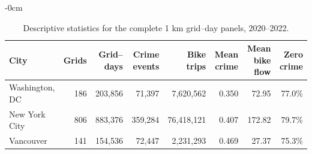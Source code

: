 
\begin{table}[H]
\caption{Descriptive statistics for the complete 1 km grid--day panels, 2020--2022.}
\label{tab:descriptive_statistics}
\begin{adjustwidth}{-\extralength}{0cm}
\raggedleft
\begin{tabular*}{\linewidth}{@{\extracolsep{\fill}}lrrrrrrr@{}}
\toprule
\textbf{City} & \textbf{Grids} & \textbf{Grid--days} &
\textbf{Crime events} & \textbf{Bike trips} &
\textbf{Mean crime} & \textbf{Mean bike flow} & \textbf{Zero crime}\\
\midrule
Washington, DC & 186 & 203,856 & 71,397 & 7,620,562 & 0.350 & 72.95 & 77.0\%\\
New York City & 806 & 883,376 & 359,284 & 76,418,121 & 0.407 & 172.82 & 79.7\%\\
Vancouver & 141 & 154,536 & 72,447 & 2,231,293 & 0.469 & 27.37 & 75.3\%\\
\bottomrule
\end{tabular*}
\end{adjustwidth}
\end{table}
